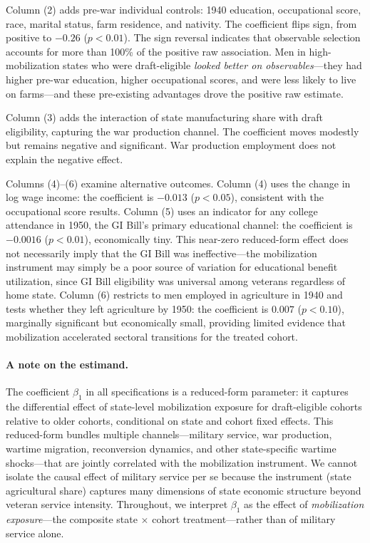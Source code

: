 \documentclass[12pt]{article}
\begin{document}


Column (2) adds pre-war individual controls: 1940 education, occupational score, race, marital status, farm residence, and nativity. The coefficient flips sign, from positive to $-0.26$ ($p < 0.01$). The sign reversal indicates that observable selection accounts for more than 100\% of the positive raw association. Men in high-mobilization states who were draft-eligible \textit{looked better on observables}---they had higher pre-war education, higher occupational scores, and were less likely to live on farms---and these pre-existing advantages drove the positive raw estimate.

Column (3) adds the interaction of state manufacturing share with draft eligibility, capturing the war production channel. The coefficient moves modestly but remains negative and significant. War production employment does not explain the negative effect.

Columns (4)--(6) examine alternative outcomes. Column (4) uses the change in log wage income: the coefficient is $-0.013$ ($p < 0.05$), consistent with the occupational score results. Column (5) uses an indicator for any college attendance in 1950, the GI Bill's primary educational channel: the coefficient is $-0.0016$ ($p < 0.01$), economically tiny. This near-zero reduced-form effect does not necessarily imply that the GI Bill was ineffective---the mobilization instrument may simply be a poor source of variation for educational benefit utilization, since GI Bill eligibility was universal among veterans regardless of home state. Column (6) restricts to men employed in agriculture in 1940 and tests whether they left agriculture by 1950: the coefficient is $0.007$ ($p < 0.10$), marginally significant but economically small, providing limited evidence that mobilization accelerated sectoral transitions for the treated cohort.

\paragraph{A note on the estimand.} The coefficient $\beta_1$ in all specifications is a reduced-form parameter: it captures the differential effect of state-level mobilization exposure for draft-eligible cohorts relative to older cohorts, conditional on state and cohort fixed effects. This reduced-form bundles multiple channels---military service, war production, wartime migration, reconversion dynamics, and other state-specific wartime shocks---that are jointly correlated with the mobilization instrument. We cannot isolate the causal effect of military service per se because the instrument (state agricultural share) captures many dimensions of state economic structure beyond veteran service intensity. Throughout, we interpret $\beta_1$ as the effect of \textit{mobilization exposure}---the composite state $\times$ cohort treatment---rather than of military service alone.
\end{document}
